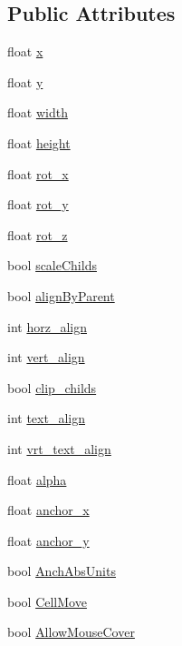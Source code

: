 \subsection*{Public Attributes}
\begin{DoxyCompactItemize}
\item 
float \hyperlink{class_n_g_u_i_symbol_a0b3df7c3753e7c006504c29672b06282}{x}
\item 
float \hyperlink{class_n_g_u_i_symbol_a9be66cc67b8c488815c9f9b64cc5040c}{y}
\item 
float \hyperlink{class_n_g_u_i_symbol_a7d7b265a935a557cb41599e3fa82bc47}{width}
\item 
float \hyperlink{class_n_g_u_i_symbol_a14e7083db3c5bc281451cb4bdf8b8c33}{height}
\item 
float \hyperlink{class_n_g_u_i_symbol_a8c84ed17473f79bcdf43aefac9a0f86c}{rot\+\_\+x}
\item 
float \hyperlink{class_n_g_u_i_symbol_a3292e1b1c125de5d3bb787f8969a866a}{rot\+\_\+y}
\item 
float \hyperlink{class_n_g_u_i_symbol_ab1fdfaafb1166dd2c82e0a5c98ee3a6a}{rot\+\_\+z}
\item 
bool \hyperlink{class_n_g_u_i_symbol_a36184100d424cb1fa8e648243fef4795}{scale\+Childs}
\item 
bool \hyperlink{class_n_g_u_i_symbol_af923443db5fa7cd94113a2cc30ffeae3}{align\+By\+Parent}
\item 
int \hyperlink{class_n_g_u_i_symbol_aac6e2ccb66c4366b68a4ff813d007f25}{horz\+\_\+align}
\item 
int \hyperlink{class_n_g_u_i_symbol_acdc9d16a07feb428f3323e4760c34b0d}{vert\+\_\+align}
\item 
bool \hyperlink{class_n_g_u_i_symbol_ad31e337d8eef4f9254694cb11d963618}{clip\+\_\+childs}
\item 
int \hyperlink{class_n_g_u_i_symbol_a7ae840941f6d996d91c572e52c148add}{text\+\_\+align}
\item 
int \hyperlink{class_n_g_u_i_symbol_a2f3a6203639494f8a335d10e918abc56}{vrt\+\_\+text\+\_\+align}
\item 
float \hyperlink{class_n_g_u_i_symbol_aaa99ad7dea080f2ba1ac563dee5329bb}{alpha}
\item 
float \hyperlink{class_n_g_u_i_symbol_ae4f8f21764404090bf7fbe8679b14109}{anchor\+\_\+x}
\item 
float \hyperlink{class_n_g_u_i_symbol_a266afe7f41114c844c46a916840f7876}{anchor\+\_\+y}
\item 
bool \hyperlink{class_n_g_u_i_symbol_a6b21b7f98a37efcf18e8e5486a4d9186}{Anch\+Abs\+Units}
\item 
bool \hyperlink{class_n_g_u_i_symbol_a5bed58d39573c4b945a26aaab8deec9c}{Cell\+Move}
\item 
bool \hyperlink{class_n_g_u_i_symbol_abe3a4c161f3376e42fcbcde784dd172e}{Allow\+Mouse\+Cover}
\end{DoxyCompactItemize}


